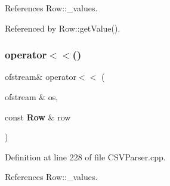 References Row\+::\+\_\+values.



Referenced by Row\+::get\+Value().

\mbox{\label{_c_s_v_parser_8cpp_ad4e8b6c4b0238a50bde8e99ec8a0dcb0}} 
\subsubsection{operator$<$$<$()\hspace{0.1cm}{\footnotesize\ttfamily [2/2]}}
{\footnotesize\ttfamily ofstream\& operator$<$$<$ (\begin{DoxyParamCaption}\item[{ofstream \&}]{os,  }\item[{const \textbf{ Row} \&}]{row }\end{DoxyParamCaption})}



Definition at line 228 of file C\+S\+V\+Parser.\+cpp.



References Row\+::\+\_\+values.

